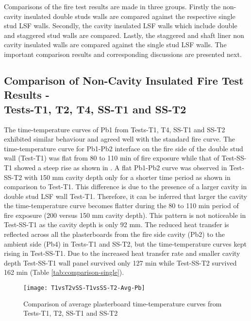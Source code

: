 Comparisons of the fire test results are made in three groups. Firstly the non-cavity insulated double studs walls are compared against the respective single stud LSF walls. Secondly, the cavity insulated LSF walls which include double and staggered stud walls are compared. Lastly, the staggered and shaft liner non cavity insulated walls are compared against the single stud LSF walls. The important comparison results and corresponding discussions are presented next.

\subsection[Comparison of Non-Cavity Insulated Fire Test Results - Tests-T1, T2, T4, SS-T1 and SS-T2]{Comparison of Non-Cavity Insulated Fire Test Results - \\Tests-T1, T2, T4, SS-T1 and SS-T2}

The time-temperature curves of Pb1 from Tests-T1, T4, SS-T1 and SS-T2 exhibited similar behaviour and agreed well with the standard fire curve. The time-temperature curve for Pb1-Pb2 interface on the fire side of the double stud wall (Test-T1) was flat from 80 to 110 min of fire exposure while that of Test-SS-T1 showed a steep rise as shown in . A flat Pb1-Pb2 curve was observed in Test-SS-T2 with 150 mm cavity depth only for a shorter time period as shown in comparison to Test-T1. This difference is due to the presence of a larger cavity in double stud LSF wall Test-T1. Therefore, it can be inferred that larger the cavity the time-temperature curve becomes flatter during the 80 to 110 min period of fire exposure (200 versus 150 mm cavity depth). This pattern is not noticeable in Test-SS-T1 as the cavity depth is only 92 mm. The reduced heat transfer is reflected across all the plasterboards from the fire side cavity (Pb2) to the ambient side (Pb4) in Tests-T1 and SS-T2, but the time-temperature curves kept rising in Test-SS-T1. Due to the increased heat transfer rate and smaller cavity depth Test-SS-T1 wall panel survived only 127 min while Test-SS-T2 survived 162 min (Table \ref{tab:comparison-single}).
\begin{figure}[!htbp]
	\centering
		\texttt{[image: T1vsT2vSS-T1vsSS-T2-Avg-Pb]}  
	\caption{Comparison of average plasterboard time-temperature curves from Tests-T1, T2, SS-T1 and SS-T2}
	\label{fig:T1vsT2vSS-T1vsSS-T2-Avg-Pb}
\end{figure}

